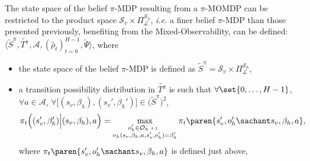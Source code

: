 The state space of the belief $\pi$-MDP resulting from a $\pi$-MOMDP 
can be restricted to the product space $\mathcal{S}_v \times \Pi^{\mathcal{S}_h}_{\mathcal{L}}$,
\textit{i.e.} 
a finer belief $\pi$-MDP than those presented previously, 
benefiting from the Mixed-Observability,
can be defined: 
$\langle \tilde{S}^{\pi}, \tilde{T^{\pi}}, \mathcal{A}, (\tilde{\rho_t})_{t=0}^{H-1}, \tilde{\Psi} \rangle$,
where
\begin{itemize}
\item the state space of the belief $\pi$-MDP is defined as $\tilde{S}^{\pi} = \mathcal{S}_v \times \Pi^{\mathcal{S}_h}_{\mathcal{L}}$,
\item a transition possibility distribution in $\tilde{T^{\pi}}$ is such that $\forall \set{ 0, \ldots, H-1 }$, $\forall a \in \mathcal{A}$,
$\forall \Big[ (s_v,\beta_h), (s_v',\beta_h') \Big]  \in \Big(\tilde{S}^{\pi}\Big)^2$, 
\[ \pi_t \Big( (s_v',\beta_h') \Big\vert (s_v,\beta_h), a  \Big) = \max_{\substack{ o_h' \in \mathcal{O}_h \mbox{ \tiny s.t. } \\ \nu_h(s_v,\beta_h,a,s_v',o_h') = \beta_h'}}
\pi_t \paren{ s_v',o_h' \sachant s_v, \beta_h, a },  \]
where $\pi_t \paren{ s_v',o_h' \sachant s_v, \beta_h, a }$ is defined just above,


\end{itemize}

